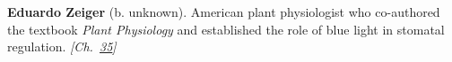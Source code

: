 \textbf{Eduardo Zeiger} (b. unknown). American plant physiologist who co-authored the textbook \emph{Plant Physiology} and established the role of blue light in stomatal regulation. \emph{[Ch.~\hyperref[ch:treesfromair]{35}]}

